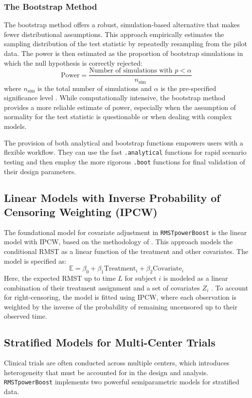 \documentclass[11pt, a4paper]{article}
\begin{document}
\subsubsection{The Bootstrap Method}
The bootstrap method offers a robust, simulation-based alternative that makes fewer distributional assumptions. This approach empirically estimates the sampling distribution of the test statistic by repeatedly resampling from the pilot data. The power is then estimated as the proportion of bootstrap simulations in which the null hypothesis is correctly rejected:
\begin{equation}
 \text{Power} = \frac{\text{Number of simulations with } p < \alpha}{n_{\text{sim}}}
\end{equation}
where $n_{\text{sim}}$ is the total number of simulations and $\alpha$ is the pre-specified significance level \cite{[1]}. While computationally intensive, the bootstrap method provides a more reliable estimate of power, especially when the assumption of normality for the test statistic is questionable or when dealing with complex models.

The provision of both analytical and bootstrap functions empowers users with a flexible workflow. They can use the fast \texttt{.analytical} functions for rapid scenario testing and then employ the more rigorous \texttt{.boot} functions for final validation of their design parameters.

\subsection{Linear Models with Inverse Probability of Censoring Weighting (IPCW)}
The foundational model for covariate adjustment in \texttt{RMSTpowerBoost} is the linear model with IPCW, based on the methodology of \citet{tian2014}. This approach models the conditional RMST as a linear function of the treatment and other covariates. The model is specified as:
\begin{equation}
\mathbb{E} = \beta_0 + \beta_1 \text{Treatment}_i + \beta_2 \text{Covariate}_{i}
\end{equation}
Here, the expected RMST up to time $L$ for subject $i$ is modeled as a linear combination of their treatment assignment and a set of covariates $Z_i$ \cite{[1]}. To account for right-censoring, the model is fitted using IPCW, where each observation is weighted by the inverse of the probability of remaining uncensored up to their observed time.

\subsection{Stratified Models for Multi-Center Trials}
Clinical trials are often conducted across multiple centers, which introduces heterogeneity that must be accounted for in the design and analysis. \texttt{RMSTpowerBoost} implements two powerful semiparametric models for stratified data.
\end{document}
